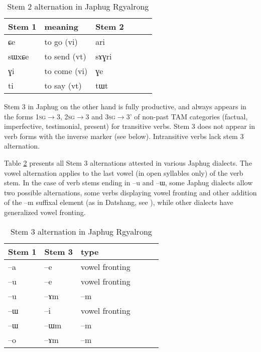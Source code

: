 \documentclass[oldfontcommands,oneside,a4paper,11pt]{article}
\newcommand{\ipa}[1]{{\phon #1}} %
\begin{document}
 \begin{table} 
\caption{Stem 2 alternation in Japhug Rgyalrong} \label{tab:stem2} \centering
\begin{tabular}{llllll}
\toprule
Stem 1 & meaning &Stem 2 \\
\midrule
\ipa{ɕe}& to go (vi)&  \ipa{ari} \\
\ipa{sɯxɕe}& to send (vt)  &\ipa{sɤɣri} \\
\ipa{ɣi}& to come (vi)  &\ipa{ɣe} \\
\ipa{ti}& to say (vt)  &\ipa{tɯt} \\
\bottomrule
\end{tabular}
\end{table}

Stem 3 in Japhug on the other hand is fully productive, and always appears in the forms \textsc{1sg}$\rightarrow$3, \textsc{2sg}$\rightarrow$3 and \textsc{3sg}$\rightarrow$3' of non-past TAM categories (factual, imperfective, testimonial, present) for transitive verbs. Stem 3 does not appear in verb forms with the inverse marker (see below). Intransitive verbs lack stem 3 alternation.

Table \ref{tab:stem3} presents all Stem 3 alternations attested in various Japhug dialects. The vowel alternation applies to the last vowel (in open syllables only) of the verb stem. In the case of verb stems ending in  \ipa{--u} and  \ipa{--ɯ}, some Japhug dialects allow two possible alternations, some verbs displaying vowel fronting and other addition of the \ipa{--m} suffixal element (as in Datshang, see \citealt{linluo03}), while other dialects have generalized vowel fronting.

 \begin{table} 
\caption{Stem 3 alternation in Japhug Rgyalrong} \label{tab:stem3} \centering
\begin{tabular}{llllll}
\toprule
Stem 1 & Stem 3& type \\
\midrule
 \ipa{--a} & \ipa{--e} & vowel fronting\\
 \ipa{--u} & \ipa{--e} & vowel fronting\\
\ipa{--u} & \ipa{--ɤm} & \ipa{--m} \\
\ipa{--ɯ} & \ipa{--i} & vowel fronting\\
\ipa{--ɯ} & \ipa{--ɯm} & \ipa{--m}\\
\ipa{--o} & \ipa{--ɤm} & \ipa{--m} \\
\bottomrule
\end{tabular}
\end{table}
\end{document}
